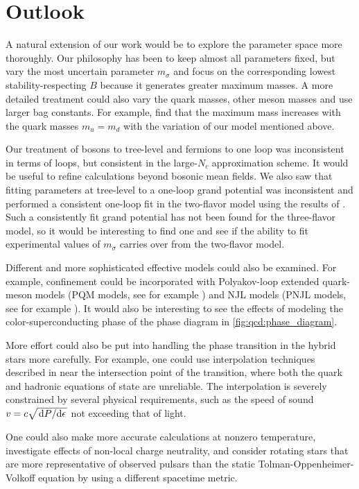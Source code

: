 \section{Outlook}

A natural extension of our work would be to
explore the parameter space more thoroughly.
Our philosophy has been to keep almost all parameters fixed,
but vary the most uncertain parameter $m_\sigma$ and focus on the corresponding lowest stability-respecting $B$
because it generates greater maximum masses.
A more detailed treatment could also vary the quark masses,
other meson masses and use larger bag constants.
For example, \cite{ref:lsm3f_compact_stars}
find that the maximum mass increases with the quark masses $m_u=m_d$
with the variation of our model mentioned above.

Our treatment of bosons to tree-level and fermions to one loop was inconsistent in terms of loops,
but consistent in the large-$N_c$ approximation scheme.
It would be useful to refine calculations beyond bosonic mean fields.
We also saw that fitting parameters at tree-level to a one-loop grand potential was inconsistent
and performed a consistent one-loop fit in the two-flavor model using the results of \cite{ref:jo_lsm_consistent_chiral,ref:jo_lsm_consistent_physical}.
Such a consistently fit grand potential has not been found for the three-flavor model,
so it would be interesting to find one and see if the ability to fit experimental values of $m_\sigma$ carries over from the two-flavor model.

Different and more sophisticated effective models could also be examined.
For example, confinement could be incorporated with Polyakov-loop extended quark-meson models (PQM models, see for example \cite{ref:pqm_2f,ref:pqm_3f,ref:master_folkestad}) and NJL models (PNJL models, see for example \cite{ref:pnjl_2f,ref:pnjl_3f,ref:pnjl_3f_zeroT}).
It would also be interesting to see the effects of modeling the color-superconducting phase of the phase diagram in \cref{fig:qcd:phase_diagram}.

More effort could also be put into handling the phase transition in the hybrid stars more carefully.
For example, one could use interpolation techniques described in \cite{ref:quark_star_review}
near the intersection point of the transition,
where both the quark and hadronic equations of state are unreliable.
The interpolation is severely constrained by several physical requirements,
such as the speed of sound $v = c \sqrt{\odv{P}/{\epsilon}}$ not exceeding that of light.

One could also make more accurate calculations at nonzero temperature,
investigate effects of non-local charge neutrality,
and consider rotating stars that are more representative of observed pulsars than the static Tolman-Oppenheimer-Volkoff equation by using a different spacetime metric.
